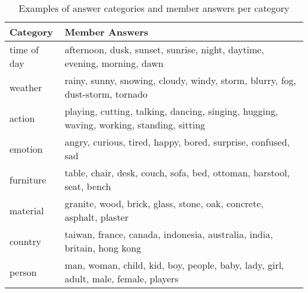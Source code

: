 \begin{table*}[H]
    \centering
    \small
    \begin{tabular}{@{}ll @{}}
        \toprule
        \textbf{Category} & \textbf{Member Answers}\\
        \toprule
        time of day & afternoon, dusk, sunset, sunrise, night, daytime, evening, morning, dawn\\
        weather     & rainy, sunny, snowing, cloudy, windy, storm, blurry, fog, dust-storm, tornado \\
        action      & playing, cutting, talking, dancing, singing, hugging, waving, working, standing, sitting \\
        emotion     & angry, curious, tired, happy, bored, surprise, confused, sad \\
        furniture   & table, chair, desk, couch, sofa, bed, ottoman, barstool, seat, bench \\
        material    & granite, wood, brick, glass, stone, oak, concrete, asphalt, plaster \\
        country     & taiwan, france, canada, indonesia, australia, india, britain, hong kong \\
        person      & man, woman, child, kid, boy, people, baby, lady, girl, adult, male, female, players \\
        \bottomrule
    \end{tabular}
    \caption{Examples of answer categories and member answers per category}
    \label{tab:categories}
\end{table*}